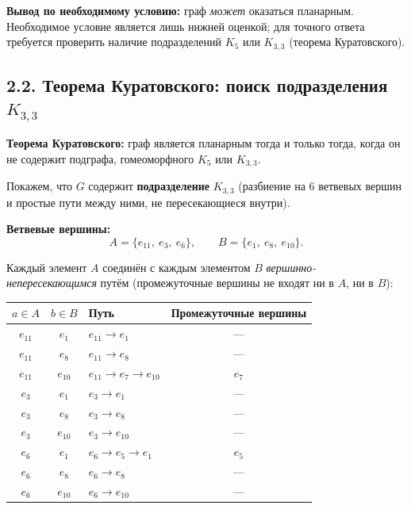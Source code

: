 \documentclass[a4paper,12pt]{article}
\begin{document}
\textbf{Вывод по необходимому условию:} граф \emph{может} оказаться планарным.
Необходимое условие является лишь нижней оценкой; для точного ответа
требуется проверить наличие подразделений $K_5$ или $K_{3,3}$ (теорема Куратовского).

\subsection*{2.2. Теорема Куратовского: поиск подразделения $K_{3,3}$}

\textbf{Теорема Куратовского:} граф является планарным тогда и только тогда, когда
он не содержит подграфа, гомеоморфного $K_5$ или $K_{3,3}$.

Покажем, что $G$ содержит \textbf{подразделение} $K_{3,3}$ (разбиение на 6 ветвевых
вершин и простые пути между ними, не пересекающиеся внутри).

\bigskip
\noindent\textbf{Ветвевые вершины:}
\[
	A = \{e_{11},\ e_3,\ e_6\}, \qquad B = \{e_1,\ e_8,\ e_{10}\}.
\]

Каждый элемент $A$ соединён с каждым элементом $B$ \emph{вершинно-непересекающимся}
путём (промежуточные вершины не входят ни в $A$, ни в $B$):

\begin{center}
	\renewcommand{\arraystretch}{1.4}
	\begin{tabular}{|c|c|l|c|}
		\hline
		$a \in A$ & $b \in B$ & \textbf{Путь}               & \textbf{Промежуточные вершины} \\
		\hline
		$e_{11}$  & $e_1$     & $e_{11} \to e_1$            & ---                            \\
		$e_{11}$  & $e_8$     & $e_{11} \to e_8$            & ---                            \\
		$e_{11}$  & $e_{10}$  & $e_{11} \to e_7 \to e_{10}$ & $e_7$                          \\
		$e_3$     & $e_1$     & $e_3 \to e_1$               & ---                            \\
		$e_3$     & $e_8$     & $e_3 \to e_8$               & ---                            \\
		$e_3$     & $e_{10}$  & $e_3 \to e_{10}$            & ---                            \\
		$e_6$     & $e_1$     & $e_6 \to e_5 \to e_1$       & $e_5$                          \\
		$e_6$     & $e_8$     & $e_6 \to e_8$               & ---                            \\
		$e_6$     & $e_{10}$  & $e_6 \to e_{10}$            & ---                            \\
		\hline
	\end{tabular}
\end{center}
\end{document}
